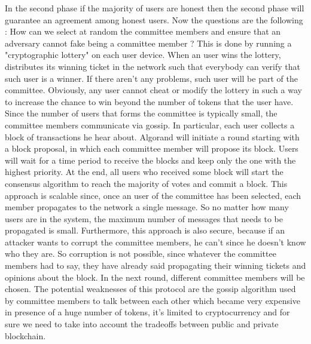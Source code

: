 In the second phase if the majority of users are honest then the second phase will guarantee an agreement among honest users. Now the questions are the following : How can we select at random the committee members and ensure that an adversary cannot fake being a committee member ? This is done by running a "cryptographic lottery" on each user device. When an user wins the lottery, distributes its winning ticket in the network such that everybody can verify that such user is a winner. If there aren't any problems, such user will be part of the committee. Obviously, any user cannot cheat or modify the lottery in such a way to increase the chance to win beyond the number of tokens that the user have. Since the number of users that forms the committee is typically small, the committee members communicate via gossip. In particular, each user collects a block of transactions he hear about. Algorand will initiate a round starting with a block proposal, in which each committee member will propose its block. Users will wait for a time period to receive the blocks and keep only the one with the highest priority. At the end, all users who received some block will start the consensus algorithm to reach the majority of votes and commit a block. This approach is scalable since, once an user of the committee has been selected, each member propagates to the network a single message. So no matter how many users are in the system, the maximum number of messages that needs to be propagated is small. Furthermore, this approach is also secure, because if an attacker wants to corrupt the committee members, he can't since he doesn't know who they are. So corruption is not possible, since whatever the committee members had to say, they have already said propagating their winning tickets and opinions about the block. In the next round, different committee members will be chosen. The potential weaknesses of this protocol are the gossip algorithm used by committee members to talk between each other which became very expensive in presence of a huge number of tokens, it's limited to cryptocurrency and for sure we need to take into account the tradeoffs between public and private blockchain.